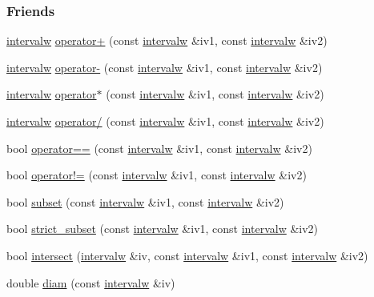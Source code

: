 \subsubsection*{\-Friends}
\begin{DoxyCompactItemize}
\item 
\hyperlink{classintervalw}{intervalw} \hyperlink{classintervalw_a5714798d19e959ff5915dd7df6d1f730}{operator+} (const \hyperlink{classintervalw}{intervalw} \&iv1, const \hyperlink{classintervalw}{intervalw} \&iv2)
\item 
\hyperlink{classintervalw}{intervalw} \hyperlink{classintervalw_a5dbeffff961fa529c8d6b6dcba9724db}{operator-\/} (const \hyperlink{classintervalw}{intervalw} \&iv1, const \hyperlink{classintervalw}{intervalw} \&iv2)
\item 
\hyperlink{classintervalw}{intervalw} \hyperlink{classintervalw_abfd33cbc65aecd57e41d3e59743b9288}{operator$\ast$} (const \hyperlink{classintervalw}{intervalw} \&iv1, const \hyperlink{classintervalw}{intervalw} \&iv2)
\item 
\hyperlink{classintervalw}{intervalw} \hyperlink{classintervalw_a3c1fb4dc65cf6e1dc5f59bb369a93110}{operator/} (const \hyperlink{classintervalw}{intervalw} \&iv1, const \hyperlink{classintervalw}{intervalw} \&iv2)
\item 
bool \hyperlink{classintervalw_a150676692c521311361d5f159622a49f}{operator==} (const \hyperlink{classintervalw}{intervalw} \&iv1, const \hyperlink{classintervalw}{intervalw} \&iv2)
\item 
bool \hyperlink{classintervalw_ae4d516016b53e66b9ffb33f34e52ccca}{operator!=} (const \hyperlink{classintervalw}{intervalw} \&iv1, const \hyperlink{classintervalw}{intervalw} \&iv2)
\item 
bool \hyperlink{classintervalw_a77c3b26a38e28e1fa9ce1d7f1627a6a7}{subset} (const \hyperlink{classintervalw}{intervalw} \&iv1, const \hyperlink{classintervalw}{intervalw} \&iv2)
\item 
bool \hyperlink{classintervalw_a8b1ccfeedd72f380956f36659fd97d4b}{strict\-\_\-subset} (const \hyperlink{classintervalw}{intervalw} \&iv1, const \hyperlink{classintervalw}{intervalw} \&iv2)
\item 
bool \hyperlink{classintervalw_ad93e7d37361a423cb440832b3c3f89f9}{intersect} (\hyperlink{classintervalw}{intervalw} \&iv, const \hyperlink{classintervalw}{intervalw} \&iv1, const \hyperlink{classintervalw}{intervalw} \&iv2)
\item 
double \hyperlink{classintervalw_aa6f4cf3222eff62a9ab33b18332914d1}{diam} (const \hyperlink{classintervalw}{intervalw} \&iv)

\end{DoxyCompactItemize}
